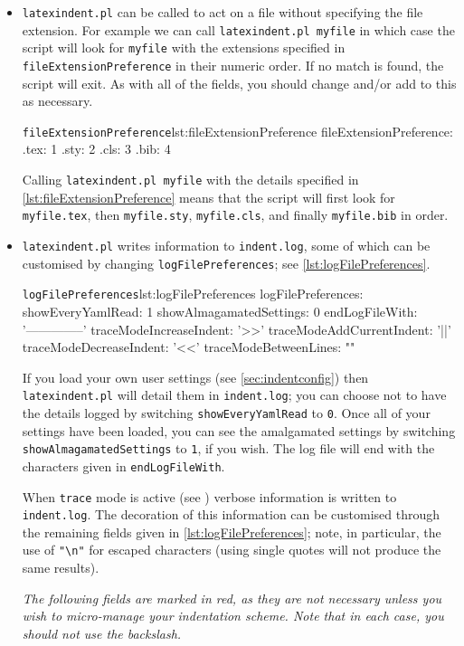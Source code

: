 \documentclass[11pt]{article}
\newcommand{\verbitem}[1]{\small\PVerb{#1}}
\begin{document}
\begin{itemize}
	\item[\verbitem{fileExtensionPreference}] \lstinline!latexindent.pl! can be called to
	      act on a file without
	      specifying the file extension.  For example we can call \lstinline!latexindent.pl myfile!
	      in which case the script will look for \lstinline!myfile! with the extensions
	      specified in \lstinline!fileExtensionPreference! in their numeric order. If
	      no match is found, the script will exit. As with all of the fields, you should
	      change and/or add to this as necessary.
	      \begin{cmhlistings}[style=yaml]{\lstinline!fileExtensionPreference!}{lst:fileExtensionPreference}
fileExtensionPreference:
    .tex: 1
    .sty: 2
    .cls: 3
    .bib: 4
	\end{cmhlistings}
	Calling \lstinline!latexindent.pl myfile! with the details specified in \cref{lst:fileExtensionPreference}
	means that the script will first look for \lstinline!myfile.tex!, then \lstinline!myfile.sty!, \lstinline!myfile.cls!, 
    and finally \lstinline!myfile.bib! in order.
\item[\verbitem{logFilePreferences}] 
  \lstinline!latexindent.pl! writes information to \lstinline!indent.log!, some 
  of which can be customised by changing \lstinline!logFilePreferences!; see \cref{lst:logFilePreferences}.
\begin{cmhlistings}[style=yaml]{\lstinline!logFilePreferences!}{lst:logFilePreferences}
logFilePreferences:
    showEveryYamlRead: 1
    showAlmagamatedSettings: 0
    endLogFileWith: '--------------' 
    traceModeIncreaseIndent: '>>'
    traceModeAddCurrentIndent: '||'
    traceModeDecreaseIndent: '<<'
    traceModeBetweenLines: "\n"
  \end{cmhlistings}
If you load your own user settings (see \vref{sec:indentconfig}) then \lstinline!latexindent.pl! will
detail them in \lstinline!indent.log!; you can choose not to have the details logged by switching
\lstinline!showEveryYamlRead! to \lstinline!0!. Once all of your settings have 
been loaded, you can see the amalgamated settings by switching \lstinline!showAlmagamatedSettings! 
to \lstinline!1!, if you wish. The log file will end with the characters 
given in \lstinline!endLogFileWith!.

When \lstinline!trace! mode is active (see ) verbose information is written 
to \lstinline!indent.log!. The decoration of this information can be customised through the remaining
fields given in \cref{lst:logFilePreferences}; note, in particular, the use of \lstinline!"\n"! for 
escaped characters (using single quotes will not produce the same results).
	\begin{warning}
		\emph{The following fields are marked in red, as they are not necessary
			unless you wish to micro-manage your indentation scheme.
			Note that in each case, you should \emph{not} use the backslash.}
	\end{warning}


\end{itemize}
\end{document}
